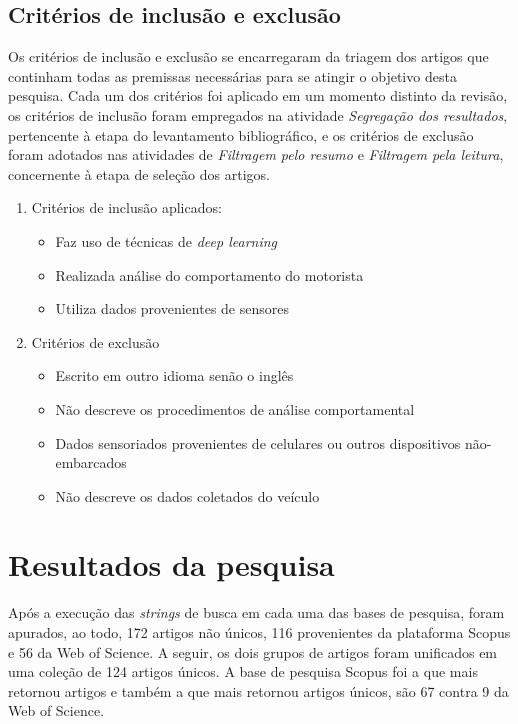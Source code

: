 \documentclass[10pt,journal,compsoc]{IEEEtran}
\begin{document}
\subsection{Critérios de inclusão e exclusão}
\label{sec:protocolo:inclusao}
Os critérios de inclusão e exclusão se encarregaram da triagem dos artigos
que continham todas as premissas necessárias para se atingir o
objetivo desta pesquisa. Cada um dos critérios foi aplicado em um momento
distinto da revisão, os critérios de inclusão foram empregados na
atividade \emph{Segregação dos resultados}, pertencente à etapa do
levantamento bibliográfico, e os critérios de exclusão foram adotados
nas atividades de \emph{Filtragem pelo resumo} e \emph{Filtragem pela
  leitura}, concernente à etapa de seleção dos artigos.

\begin{enumerate}
\item Critérios de inclusão aplicados:
\begin{itemize}
\item Faz uso de técnicas de \textit{deep learning}
\item Realizada análise do comportamento do motorista
\item Utiliza dados provenientes de sensores
\end{itemize}
  \item Critérios de exclusão
\begin{itemize}
\item Escrito em outro idioma senão o inglês
\item Não descreve os procedimentos de análise comportamental
\item Dados sensoriados provenientes de celulares ou outros
  dispositivos não-embarcados
\item Não descreve os dados coletados do veículo
\end{itemize}
\end{enumerate}

\section{Resultados da pesquisa}
\label{sec:resultados}
Após a execução das \textit{strings} de busca em cada uma das bases de
pesquisa, foram apurados, ao todo, 172 artigos não únicos, 116
provenientes da plataforma Scopus e 56 da Web of Science. A seguir, os dois grupos de
artigos foram unificados em uma coleção de 124 artigos únicos. A base de pesquisa Scopus foi a que mais retornou artigos e também a
que mais retornou artigos únicos, são 67 contra 9 da Web of Science.
\end{document}
